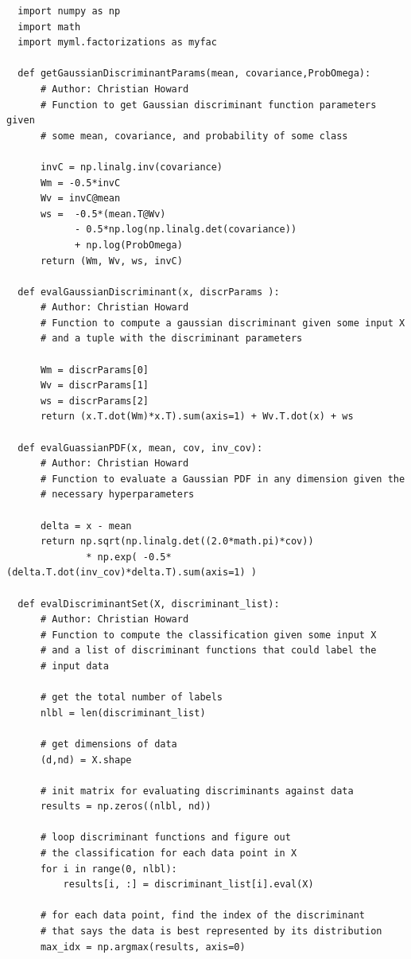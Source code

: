 \documentclass{article}[12pt]
\begin{document}
\begin{verbatim}
  import numpy as np
  import math
  import myml.factorizations as myfac

  def getGaussianDiscriminantParams(mean, covariance,ProbOmega):
      # Author: Christian Howard
      # Function to get Gaussian discriminant function parameters given
      # some mean, covariance, and probability of some class

      invC = np.linalg.inv(covariance)
      Wm = -0.5*invC
      Wv = invC@mean
      ws =  -0.5*(mean.T@Wv) 
            - 0.5*np.log(np.linalg.det(covariance)) 
            + np.log(ProbOmega)
      return (Wm, Wv, ws, invC)

  def evalGaussianDiscriminant(x, discrParams ):
      # Author: Christian Howard
      # Function to compute a gaussian discriminant given some input X
      # and a tuple with the discriminant parameters

      Wm = discrParams[0]
      Wv = discrParams[1]
      ws = discrParams[2]
      return (x.T.dot(Wm)*x.T).sum(axis=1) + Wv.T.dot(x) + ws

  def evalGuassianPDF(x, mean, cov, inv_cov):
      # Author: Christian Howard
      # Function to evaluate a Gaussian PDF in any dimension given the
      # necessary hyperparameters

      delta = x - mean
      return np.sqrt(np.linalg.det((2.0*math.pi)*cov))
              * np.exp( -0.5*(delta.T.dot(inv_cov)*delta.T).sum(axis=1) )

  def evalDiscriminantSet(X, discriminant_list):
      # Author: Christian Howard
      # Function to compute the classification given some input X
      # and a list of discriminant functions that could label the
      # input data

      # get the total number of labels
      nlbl = len(discriminant_list)

      # get dimensions of data
      (d,nd) = X.shape

      # init matrix for evaluating discriminants against data
      results = np.zeros((nlbl, nd))

      # loop discriminant functions and figure out
      # the classification for each data point in X
      for i in range(0, nlbl):
          results[i, :] = discriminant_list[i].eval(X)

      # for each data point, find the index of the discriminant
      # that says the data is best represented by its distribution
      max_idx = np.argmax(results, axis=0)


\end{verbatim}
\end{document}
